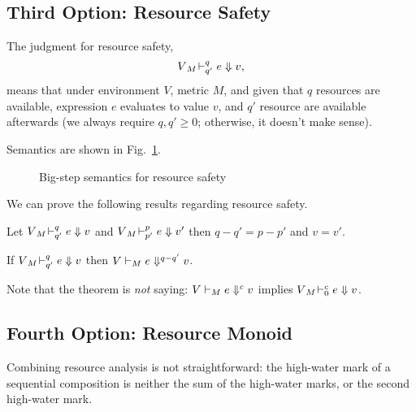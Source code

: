 \documentclass[ manuscript,screen, nonacm]{acmart}
\begin{document}
\subsection{Third Option: Resource Safety}

The judgment for resource safety, 
\[V {}_{M}\!\vdash^{q}_{q'} e \Downarrow v,\]
means that under environment $V$, metric $M$, and given that $q$ resources are available, expression $e$ evaluates to value $v$, and $q'$ resource are available afterwards (we always require $q,q'\geq 0$; otherwise, it doesn't make sense).

Semantics are shown in Fig.~\ref{fig-semReSafety}.

\begin{figure}[htb]
\caption{Big-step semantics for resource safety}
\label{fig-semReSafety}
\end{figure}

We can prove the following results regarding resource safety.
\begin{lemma}
Let $V {}_{M}\!\vdash^{q}_{q'} e \Downarrow v$ and $V {}_{M}\!\vdash^{p}_{p'} e \Downarrow v'$  
then $q-q'=p-p'$ and $v=v'$.
\end{lemma} 
\begin{theorem}\label{resource-safety-big}
If $V {}_{M}\!\vdash^{q}_{q'} e \Downarrow v$ then $V \vdash_{M} e \Downarrow^{q-q'}v$.
\end{theorem} 
Note that the theorem is \emph{not} saying: $V \vdash_{M} e \Downarrow^{c}v$ implies $V {}_{M}\!\vdash^{c}_{0} e \Downarrow v$. 

\subsection{Fourth Option: Resource Monoid}
Combining resource analysis is not straightforward: the high-water mark of a sequential
composition is neither the sum of the high-water marks, or the second high-water
mark.
\end{document}
